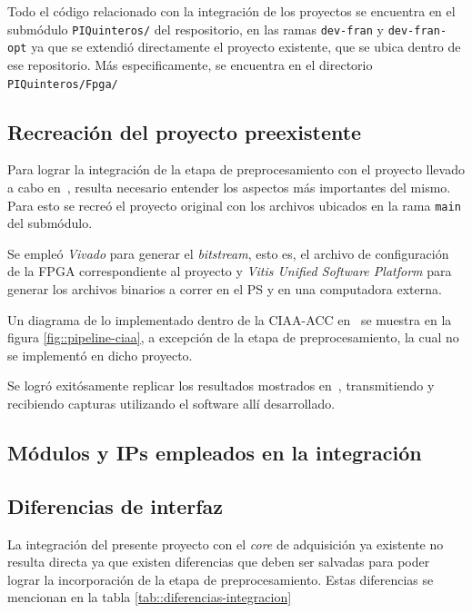 \documentclass[../../main.tex]{subfiles}
\begin{document}
Todo el código relacionado con la integración de los proyectos se encuentra en el submódulo \texttt{PIQuinteros/} del respositorio, en las ramas \texttt{dev-fran} y \texttt{dev-fran-opt} ya que se extendió directamente el proyecto existente, que se ubica dentro de ese repositorio. Más especificamente, se encuentra en el directorio \texttt{PIQuinteros/Fpga/}

\subsection{Recreación del proyecto preexistente}
Para lograr la integración de la etapa de preprocesamiento con el proyecto llevado a cabo en~\cite{proyecto-jose}, resulta necesario entender los aspectos más importantes del mismo. Para esto se recreó el proyecto original con los archivos ubicados en la rama \texttt{main} del submódulo.

Se empleó \textit{Vivado} para generar el \textit{bitstream}, esto es, el archivo de configuración de la FPGA correspondiente al proyecto y \textit{Vitis Unified Software Platform} para generar los archivos binarios a correr en el PS y en una computadora externa.

Un diagrama de lo implementado dentro de la CIAA-ACC en~\cite{proyecto-jose} se muestra en la figura \ref{fig::pipeline-ciaa}, a excepción de la etapa de preprocesamiento, la cual no se implementó en dicho proyecto.

Se logró exitósamente replicar los resultados mostrados en~\cite{proyecto-jose}, transmitiendo y recibiendo capturas utilizando el software allí desarrollado.

\subsection{Módulos y IPs empleados en la integración}


\subsection{Diferencias de interfaz}
La integración del presente proyecto con el \textit{core} de adquisición ya existente no resulta directa ya que existen diferencias que deben ser salvadas para poder lograr la incorporación de la etapa de preprocesamiento. Estas diferencias se mencionan en la tabla \ref{tab::diferencias-integracion}
\end{document}

